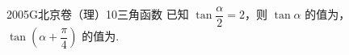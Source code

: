 
\begin{problem}{2005}{G}{北京卷（理）}{10}{三角函数}
已知 $\tan\dfrac{\alpha}{2}=2$，则 $\tan\alpha$ 的值为\underline{\hspace{4em}}，$\tan\left(\alpha+\dfrac{\pi}{4}\right)$ 的值为\underline{\hspace{4em}}.
\end{problem}

\begin{answer}

\end{answer}

\begin{solutions}

\end{solutions}